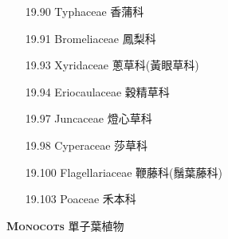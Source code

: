 \begin{enumerate}
    \begin{enumerate}
      \item[19.90] Typhaceae 香蒲科     
        
      \item[19.91] Bromeliaceae 鳳梨科     
        
      \item[19.93] Xyridaceae 蔥草科(黃眼草科)     
        
      \item[19.94] Eriocaulaceae 穀精草科     
        
      \item[19.97] Juncaceae 燈心草科     
        
      \item[19.98] Cyperaceae 莎草科     
        
      \item[19.100] Flagellariaceae 鞭藤科(鬚葉藤科)     
        
      \item[19.103] Poaceae 禾本科     
        
    \end{enumerate}
\end{enumerate}
\vspace{2ex} 
\noindent \normalsize\textsc{\textbf{Monocots} 單子葉植物}\selectfont \\
\footnotesize\selectfont
